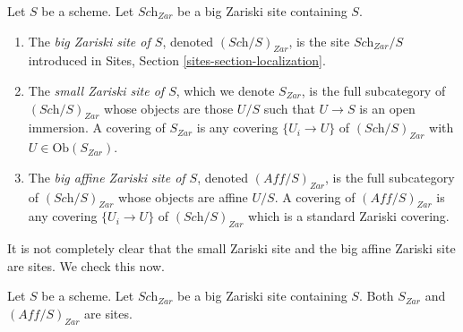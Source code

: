 \begin{definition}
\label{definition-big-small-Zariski}
Let $S$ be a scheme. Let $\textit{Sch}_{Zar}$ be a big Zariski
site containing $S$.
\begin{enumerate}
\item The {\it big Zariski site of $S$}, denoted
$(\textit{Sch}/S)_{Zar}$, is the site $\textit{Sch}_{Zar}/S$
introduced in Sites, Section \ref{sites-section-localization}.
\item The {\it small Zariski site of $S$}, which we denote
$S_{Zar}$, is the full subcategory of $(\textit{Sch}/S)_{Zar}$
whose objects are those $U/S$ such that $U \to S$ is an open immersion.
A covering of $S_{Zar}$ is any covering $\{U_i \to U\}$ of
$(\textit{Sch}/S)_{Zar}$ with $U \in \text{Ob}(S_{Zar})$.
\item The {\it big affine Zariski site of $S$}, denoted
$(\textit{Aff}/S)_{Zar}$, is the full subcategory of
$(\textit{Sch}/S)_{Zar}$ whose objects are affine $U/S$.
A covering of $(\textit{Aff}/S)_{Zar}$ is any covering
$\{U_i \to U\}$ of $(\textit{Sch}/S)_{Zar}$ which is a
standard Zariski covering.
\end{enumerate}
\end{definition}

\noindent
It is not completely clear that the small Zariski site and
the big affine Zariski site are sites. We check this now.

\begin{lemma}
\label{lemma-verify-site-Zariski}
Let $S$ be a scheme. Let $\textit{Sch}_{Zar}$ be a big Zariski
site containing $S$.
Both $S_{Zar}$ and $(\textit{Aff}/S)_{Zar}$ are sites.
\end{lemma}

